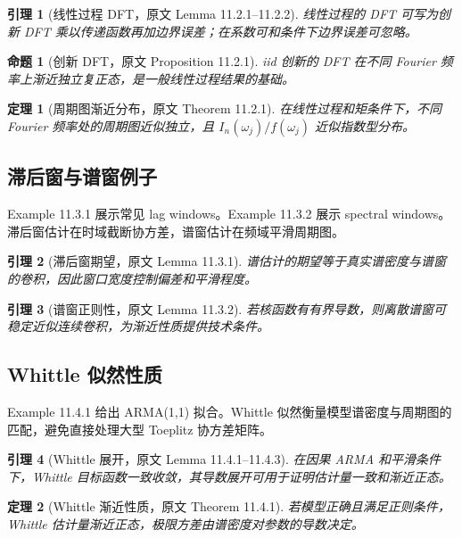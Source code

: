 \documentclass[11pt,a4paper]{ctexart}
\newtheorem{theorem}{定理}[section]
\newtheorem{lemma}{引理}[section]
\newtheorem{proposition}{命题}[section]
\begin{document}
\begin{lemma}[线性过程 DFT，原文 Lemma 11.2.1--11.2.2]
线性过程的 DFT 可写为创新 DFT 乘以传递函数再加边界误差；在系数可和条件下边界误差可忽略。
\end{lemma}

\begin{proposition}[创新 DFT，原文 Proposition 11.2.1]
iid 创新的 DFT 在不同 Fourier 频率上渐近独立复正态，是一般线性过程结果的基础。
\end{proposition}

\begin{theorem}[周期图渐近分布，原文 Theorem 11.2.1]
在线性过程和矩条件下，不同 Fourier 频率处的周期图近似独立，且 \(I_n(\omega_j)/f(\omega_j)\) 近似指数型分布。
\end{theorem}

\subsection{滞后窗与谱窗例子}
Example 11.3.1 展示常见 lag windows。Example 11.3.2 展示 spectral windows。滞后窗估计在时域截断协方差，谱窗估计在频域平滑周期图。

\begin{lemma}[滞后窗期望，原文 Lemma 11.3.1]
谱估计的期望等于真实谱密度与谱窗的卷积，因此窗口宽度控制偏差和平滑程度。
\end{lemma}

\begin{lemma}[谱窗正则性，原文 Lemma 11.3.2]
若核函数有有界导数，则离散谱窗可稳定近似连续卷积，为渐近性质提供技术条件。
\end{lemma}

\subsection{Whittle 似然性质}
Example 11.4.1 给出 ARMA(1,1) 拟合。Whittle 似然衡量模型谱密度与周期图的匹配，避免直接处理大型 Toeplitz 协方差矩阵。

\begin{lemma}[Whittle 展开，原文 Lemma 11.4.1--11.4.3]
在因果 ARMA 和平滑条件下，Whittle 目标函数一致收敛，其导数展开可用于证明估计量一致和渐近正态。
\end{lemma}

\begin{theorem}[Whittle 渐近性质，原文 Theorem 11.4.1]
若模型正确且满足正则条件，Whittle 估计量渐近正态，极限方差由谱密度对参数的导数决定。
\end{theorem}
\end{document}
